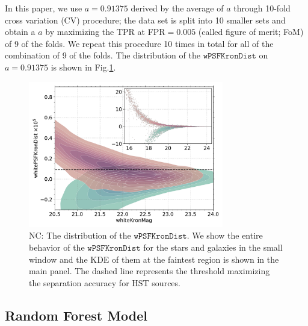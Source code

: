\documentclass[twocolumn]{aastex62}
\newcommand{\NC}[1]{{\color{brown} NC: {#1}}}
\begin{document}
{In this paper, we use $a=0.91375$ derived by the average of $a$ 
through 10-fold cross variation (CV) procedure;   
the data set is split into 10 smaller sets 
and obtain a $a$ by maximizing the TPR at FPR$ = 0.005$ 
(called figure of merit; FoM) of 9 of the folds. 
We repeat this procedure 10 times in total for all of the combination of 9 of the folds. 
The distribution of the $\mathtt{wPSFKronDist}$ on $a=0.91375$ is shown in Fig.\ref{fig:psfkrondist}. 

\begin{figure}[t]
 \centering
  \includegraphics[width=3.35in, bb = 0 0 576 432]{./Figures/whitePSFKronDist.pdf}
  \caption{
  \NC{The distribution of the $\mathtt{wPSFKronDist}$. 
  We show the entire behavior of the $\mathtt{wPSFKronDist}$ for the stars and galaxies 
  in the small window and the KDE of them at the faintest region is shown in the main panel.  
  The dashed line represents the threshold maximizing the separation accuracy for HST sources. }
 }
  \label{fig:psfkrondist}
\end{figure}
}


\subsection{Random Forest Model}\label{sec:rf_model}
\end{document}
